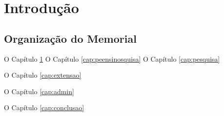 
\chapter[Introdução]{Introdução}\label{cap:introducao}

\lipsum[81]

\section{Organização do Memorial}

O Capítulo \ref{cap:introducao}
O Capítulo \ref{cap:peensinosquisa}
O Capítulo \ref{cap:pesquisa}

O Capítulo \ref{cap:extensao}

O Capítulo \ref{cap:admin}

O Capítulo \ref{cap:conclusao}





